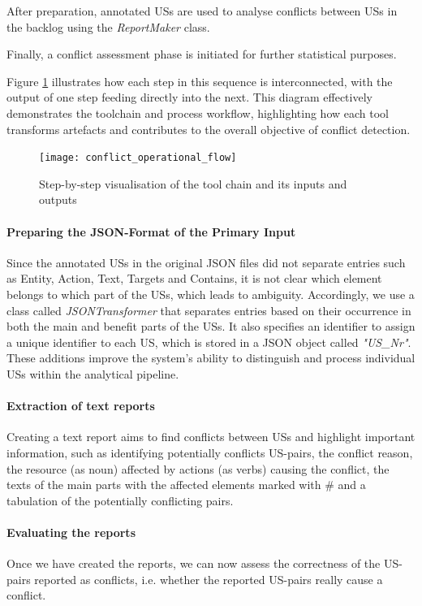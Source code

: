 After preparation, annotated USs are used to analyse conflicts between USs in the backlog using the \textit{ReportMaker} class.

Finally, a conflict assessment phase is initiated for further statistical purposes. 

Figure \ref{fig:conflict_operational_flow} illustrates how each step in this sequence is interconnected, with the output of one step feeding directly into the next. This diagram effectively demonstrates the toolchain and process workflow, highlighting how each tool transforms artefacts and contributes to the overall objective of conflict detection.
\begin{figure}[h]
	\centering 
	\texttt{[image: conflict\_operational\_flow]}
	\caption{Step-by-step visualisation of the tool chain and its inputs and outputs}\label{fig:conflict_operational_flow}
\end{figure}
\paragraph{Preparing the JSON-Format of the Primary Input}\label{conflict_workflow_preparing_json_format}
Since the annotated USs in the original JSON files did not separate entries such as Entity, Action, Text, Targets and Contains, it is not clear which element belongs to which part of the USs, which leads to ambiguity. Accordingly, we use a class called \textit{JSONTransformer} that separates entries based on their occurrence in both the main and benefit parts of the USs. It also specifies an identifier to assign a unique identifier to each US, which is stored in a JSON object called \textit{"US\_Nr"}. 
These additions improve the system's ability to distinguish and process individual USs within the analytical pipeline.

\paragraph{Extraction of text reports} Creating a text report aims to find conflicts between USs and highlight important information, such as identifying potentially conflicts US-pairs, the conflict reason, the resource (as noun) affected by actions (as verbs) causing the conflict, the texts of the main parts with the affected elements marked with \# and a tabulation of the potentially conflicting pairs.

\paragraph{Evaluating the reports} Once we have created the reports, we can now assess the correctness of the US-pairs reported as conflicts, i.e. whether the reported US-pairs really cause a conflict.

